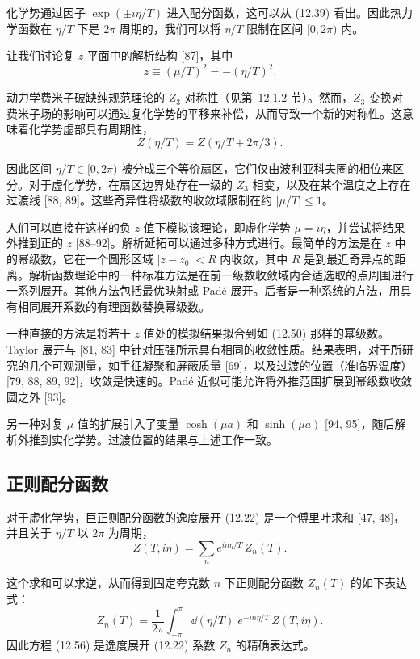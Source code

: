 化学势通过因子 $\exp(\pm i\eta/T)$ 进入配分函数，这可以从 (12.39) 看出。因此热力学函数在 $\eta/T$ 下是 $2\pi$ 周期的，我们可以将 $\eta/T$ 限制在区间 $[0, 2\pi)$ 内。

让我们讨论复 $z$ 平面中的解析结构 [87]，其中
\begin{equation}
  z \equiv (\mu/T)^2 = -(\eta/T)^2 .
\end{equation}

动力学费米子破缺纯规范理论的 $Z_3$ 对称性（见第~12.1.2 节）。然而，$Z_3$ 变换对费米子场的影响可以通过复化学势的平移来补偿，从而导致一个新的对称性。这意味着化学势虚部具有周期性，
\begin{equation}
  Z(\eta/T) = Z(\eta/T + 2\pi/3) .
\end{equation}

因此区间 $\eta/T \in [0, 2\pi)$ 被分成三个等价扇区，它们仅由波利亚科夫圈的相位来区分。对于虚化学势，在扇区边界处存在一级的 $Z_3$ 相变，以及在某个温度之上存在过渡线 [88, 89]。这些奇异性将级数的收敛域限制在约 $|\mu/T| \le 1$。

人们可以直接在这样的负 $z$ 值下模拟该理论，即虚化学势 $\mu = i\eta$，并尝试将结果外推到正的 $z$ [88--92]。解析延拓可以通过多种方式进行。最简单的方法是在 $z$ 中的幂级数，它在一个圆形区域 $|z - z_0| < R$ 内收敛，其中 $R$ 是到最近奇异点的距离。解析函数理论中的一种标准方法是在前一级数收敛域内合适选取的点周围进行一系列展开。其他方法包括最优映射或 Pad\'e 展开。后者是一种系统的方法，用具有相同展开系数的有理函数替换幂级数。

一种直接的方法是将若干 $z$ 值处的模拟结果拟合到如 (12.50) 那样的幂级数。Taylor 展开与 [81, 83] 中针对压强所示具有相同的收敛性质。结果表明，对于所研究的几个可观测量，如手征凝聚和屏蔽质量 [69]，以及过渡的位置（准临界温度）[79, 88, 89, 92]，收敛是快速的。Pad\'e 近似可能允许将外推范围扩展到幂级数收敛圆之外 [93]。

另一种对复 $\mu$ 值的扩展引入了变量 $\cosh(\mu a)$ 和 $\sinh(\mu a)$ [94, 95]，随后解析外推到实化学势。过渡位置的结果与上述工作一致。

\subsection{正则配分函数}

对于虚化学势，巨正则配分函数的逸度展开 (12.22) 是一个傅里叶求和 [47, 48]，并且关于 $\eta/T$ 以 $2\pi$ 为周期，
\begin{equation}
  Z(T, i\eta) = \sum_n e^{i n\eta/T}\,Z_n(T).
\end{equation}

这个求和可以求逆，从而得到固定夸克数 $n$ 下正则配分函数 $Z_n(T)$ 的如下表达式：
\begin{equation}
  Z_n(T) = \frac{1}{2\pi}\int_{-\pi}^{\pi}\dd(\eta/T)\;
    e^{-i n\eta/T}\,Z(T, i\eta).
\end{equation}
因此方程 (12.56) 是逸度展开 (12.22) 系数 $Z_n$ 的精确表达式。

